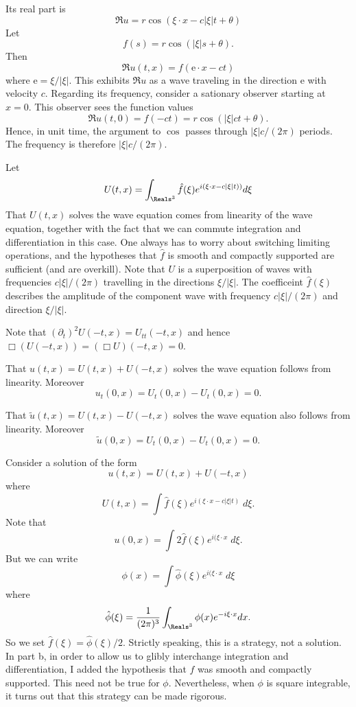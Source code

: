 \documentclass[minion]{homework}
\begin{document}
\begin{aproblems}
Its real part is
\[
\Re u = r\cos(\xi\cdot x - c |\xi| t + \theta )
\]
Let 
\[
f(s) = r\cos(|\xi| s + \theta).
\]
Then
\[
\Re u(t,x) = f(\mathrm{e}\cdot x - ct)
\]
where $\mathrm{e}=\xi/|\xi|.$  This exhibits $\Re u$ as a wave traveling in the
direction $\mathrm{e}$ with velocity $c$. Regarding its frequency, consider a sationary
observer starting at $x=0$. This observer sees
the function values
$$
\Re u(t,0) = f(-ct) = r\cos(|\xi|ct + \theta).
$$
Hence, in unit time, the argument to $\cos$ passes through $|\xi|c/(2\pi)$ periods.
The frequency is therefore $|\xi|c/(2\pi)$.

\subsol

Let
\[
U(t,x)=\int_{\Reals^3} \hat f(\xi) e^{i(\xi\cdot x - c|\xi|t) )} d\xi
\]
That $U(t,x)$ solves the wave equation comes from linearity of the wave equation,
together with the fact that we can commute integration and differentiation in this case.
One always has to worry about switching limiting operations, and the hypotheses
that $\hat f$ is smooth and compactly supported are sufficient (and are overkill).
Note that $U$ is a superposition of waves with frequencies $c|\xi|/(2\pi)$ travelling
in the directions $\xi/|\xi|$.  The coefficeint $\hat f(\xi)$ describes the amplitude
of the component wave with frequency $c|\xi|/(2\pi)$ and direction $\xi/|\xi|$.

\subsol

Note that $(\partial_t)^2 U(-t,x) = U_{tt}(-t,x)$ and hence $\Box (U(-t,x)) = (\Box U)(-t,x) = 0$.

That $u(t,x)=U(t,x)+U(-t,x)$ solves the wave equation follows from linearity.  Moreover
\[
u_t(0,x) = U_t(0,x) - U_t(0,x) = 0.
\]

That $\tilde u(t,x)=U(t,x)-U(-t,x)$ solves the wave equation also follows from linearity.  Moreover
\[
\tilde u(0,x) = U_t(0,x) - U_t(0,x) = 0.
\]

\subsol

Consider a solution of the form
\[
u(t,x) = U(t,x)+U(-t,x)
\]
where
\[
U(t,x) = \int \hat f(\xi) e^{i(\xi\cdot x - c|\xi|t)} \; d\xi.
\]
Note that
\[
u(0,x) = \int 2 \hat f(\xi) e^{i(\xi\cdot x} \; d\xi.
\]
But we can write
\[
\phi(x) = \int \hat \phi (\xi) e^{i(\xi\cdot x} \; d\xi
\]
where
\[
\hat \phi(\xi) = \frac{1}{(2\pi)^3} \int_{\Reals^3} \phi(x) e^{-i\xi\cdot x } dx.
\]
So we set $\hat f(\xi)=\hat \phi(\xi)/2$. Strictly speaking, this is a strategy, not
a solution.  In part b, in order to allow us to glibly interchange integration and differentiation,
I added the hypothesis that $\hat f$ was smooth and compactly supported.  
This need not be true for $\phi$.
Nevertheless, when $\phi$ is square integrable, it turns out that this strategy can be made
rigorous.


\end{aproblems}
\end{document}
